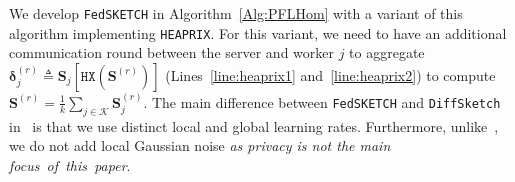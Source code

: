 \documentclass[sigconf, anonymous, review]{acmart}
\begin{document}
We develop \texttt{FedSKETCH} in Algorithm~\ref{Alg:PFLHom} with a variant of this algorithm implementing \texttt{HEAPRIX}. 
For this variant, we need to have an additional communication round between the server and worker $j$ to aggregate $\mathbf{\delta}_j^{(r)}\triangleq \mathbf{S}_j\left[\texttt{HX}(\mathbf{S}^{(r)})\right]$ (Lines~\ref{line:heaprix1} and~\ref{line:heaprix2}) to compute $ {\mathbf{S}}^{(r)}=\frac{1}{k}\sum_{j\in\mathcal{K}}\mathbf{S}^{(r)}_{j}$. The main difference between  \texttt{FedSKETCH} and \texttt{DiffSketch}  in~\cite{li2019privacy} is that we use distinct local and global learning rates. Furthermore, unlike~\citep{li2019privacy}, we do not add local Gaussian noise \emph{as privacy is not the main focus~of~this~paper}.
\end{document}
